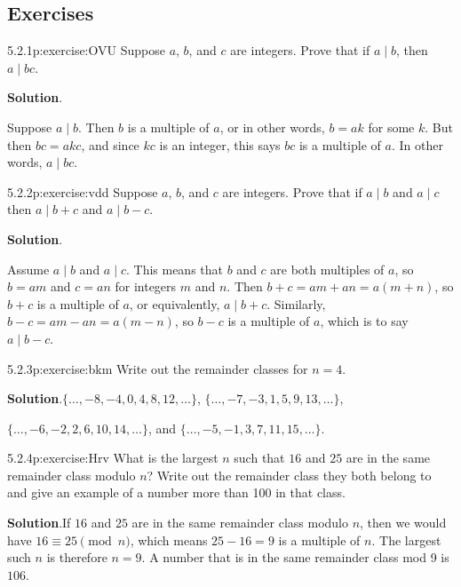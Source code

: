 \documentclass[twoside,11pt,]{book}
\newcommand{\blocktitlefont}{\relax}
\numberwithin{equation}{chapter}
\begin{document}
\subsection*{Exercises}
\begin{divisionsolution}{5.2.1}{}{p:exercise:OVU}%
Suppose \(a\), \(b\), and \(c\) are integers. Prove that if \(a \mid b\), then \(a \mid bc\).%
\par\smallskip%
\noindent\textbf{\blocktitlefont Solution}.\quad{}\begin{solutionproof}
Suppose \(a \mid b\). Then \(b\) is a multiple of \(a\), or in other words, \(b = ak\) for some \(k\). But then \(bc = akc\), and since \(kc\) is an integer, this says \(bc\) is a multiple of \(a\). In other words, \(a \mid bc\).%
\end{solutionproof}
\end{divisionsolution}%
\begin{divisionsolution}{5.2.2}{}{p:exercise:vdd}%
Suppose \(a\), \(b\), and \(c\) are integers. Prove that if \(a \mid b\) and \(a \mid c\) then \(a \mid b+c\) and \(a \mid b-c\).%
\par\smallskip%
\noindent\textbf{\blocktitlefont Solution}.\quad{}\begin{solutionproof}
Assume \(a \mid b\) and \(a \mid c\). This means that \(b\) and \(c\) are both multiples of \(a\), so \(b = am\) and \(c = an\) for integers \(m\) and \(n\). Then \(b+c = am+an = a(m+n)\), so \(b+c\) is a multiple of \(a\), or equivalently, \(a \mid b+c\). Similarly, \(b-c = am-an = a(m-n)\), so \(b-c\) is a multiple of \(a\), which is to say \(a \mid b-c\).%
\end{solutionproof}
\end{divisionsolution}%
\begin{divisionsolution}{5.2.3}{}{p:exercise:bkm}%
Write out the remainder classes for \(n = 4\).%
\par\smallskip%
\noindent\textbf{\blocktitlefont Solution}.\quad{}\(\{\ldots, -8, -4, 0, 4, 8, 12, \ldots\}\), \(\{\ldots, -7, -3, 1, 5, 9, 13, \ldots\}\),%
\par
\(\{\ldots, -6, -2, 2, 6, 10, 14, \ldots\}\), and \(\{\ldots, -5, -1, 3, 7, 11, 15, \ldots\}\).%
\end{divisionsolution}%
\begin{divisionsolution}{5.2.4}{}{p:exercise:Hrv}%
What is the largest \(n\) such that \(16\) and \(25\) are in the same remainder class modulo \(n\)?  Write out the remainder class they both belong to and give an example of a number more than 100 in that class.%
\par\smallskip%
\noindent\textbf{\blocktitlefont Solution}.\quad{}If \(16\) and \(25\) are in the same remainder class modulo \(n\), then we would have \(16 \equiv 25 \pmod{n}\), which means \(25 - 16 = 9\) is a multiple of \(n\).  The largest such \(n\) is therefore \(n = 9\).  A number that is in the same remainder class mod 9 is \(106\).%
\end{divisionsolution}%
\end{document}
